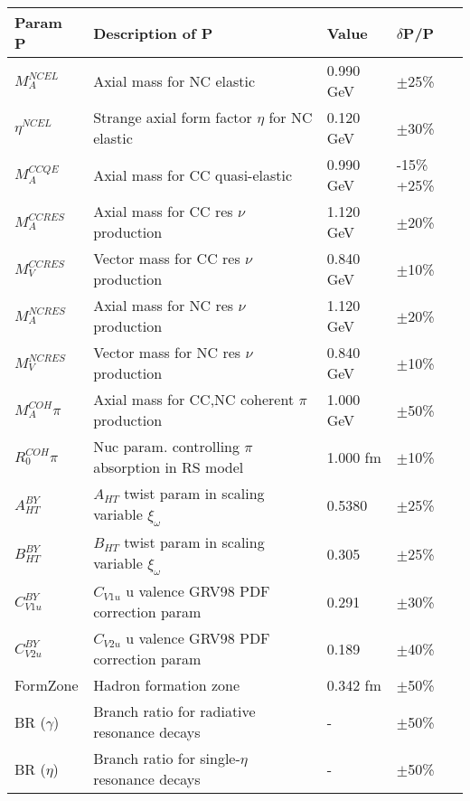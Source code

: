 \begin{table*}
\centering
{}
\begin{tabular}{| l | l | l | l |}
\hline
   Param P & Description of P & Value  & $\delta$P/P \\ [0.1ex] \hline
 $M_A^{NCEL}$  & Axial mass for NC elastic & 0.990 GeV & $\pm$25\% \\
 $\eta^{NCEL}$  & Strange axial form factor $\eta$ for NC elastic & 0.120 GeV & $\pm$30\% \\
$M_A^{CCQE}$  & Axial mass for CC quasi-elastic & 0.990 GeV & -15\% +25\% \\
$M_A^{CCRES}$  & Axial mass for CC res $\nu$ production & 1.120 GeV & $\pm$20\% \\
$M_V^{CCRES}$  & Vector mass for CC res $\nu$ production & 0.840 GeV & $\pm$10\% \\
$M_A^{NCRES}$  & Axial mass for NC res $\nu$ production & 1.120 GeV & $\pm$20\% \\
$M_V^{NCRES}$  & Vector mass for NC res $\nu$ production & 0.840 GeV & $\pm$10\% \\
$M_A^{COH}\pi$  & Axial mass for CC,NC coherent $\pi$ production & 1.000 GeV & $\pm$50\% \\
$R_0^{COH}\pi$  & Nuc param. controlling $\pi$ absorption in RS model & 1.000 fm & $\pm$10\% \\ \hline

$A_{HT}^{BY}$  & $A_{HT}$ twist param in scaling variable $\xi_\omega$ & 0.5380 & $\pm$25\% \\
$B_{HT}^{BY}$  & $B_{HT}$ twist param in scaling variable $\xi_\omega$ & 0.305 & $\pm$25\% \\
$C_{V1u}^{BY}$  & $C_{V1u}$ u valence GRV98 PDF correction param & 0.291 & $\pm$30\% \\
$C_{V2u}^{BY}$  & $C_{V2u}$ u valence GRV98 PDF correction param & 0.189 & $\pm$40\% \\ \hline

FormZone  & Hadron formation zone & 0.342 fm & $\pm$50\% \\
BR ($\gamma$)  & Branch ratio for radiative resonance decays & - & $\pm$50\% \\
BR ($\eta$)  & Branch ratio for single-$\eta$ resonance decays & - & $\pm$50\% \\ \hline


\end{tabular}
\end{table*}
